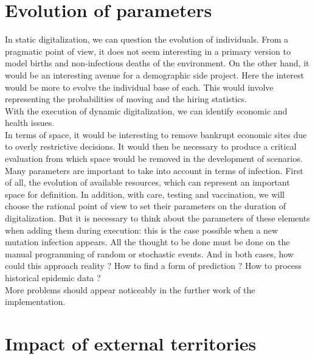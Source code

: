 \newpage

\section{Evolution of parameters}

In static digitalization, we can question the evolution of individuals. From a pragmatic point of view, it does not seem interesting in a primary version to model births and non-infectious deaths of the environment. On the other hand, it would be an interesting avenue for a demographic side project. Here the interest would be more to evolve the individual base of each. This would involve representing the probabilities of moving and the hiring statistics.\\

With the execution of dynamic digitalization, we can identify economic and health issues.\\

In terms of space, it would be interesting to remove bankrupt economic sites due to overly restrictive decisions. It would then be necessary to produce a critical evaluation from which space would be removed in the development of scenarios.\\

Many parameters are important to take into account in terms of infection. First of all, the evolution of available resources, which can represent an important space for definition. In addition, with care, testing and vaccination, we will choose the rational point of view to set their parameters on the duration of digitalization. But it is necessary to think about the parameters of these elements when adding them during execution: this is the case possible when a new mutation infection appears. All the thought to be done must be done on the manual programming of random or stochastic events. And in both cases, how could this approach reality ? How to find a form of prediction ? How to process historical epidemic data ?\\

More problems should appear noticeably in the further work of the implementation.\\

\newpage

\section{Impact of external territories}

